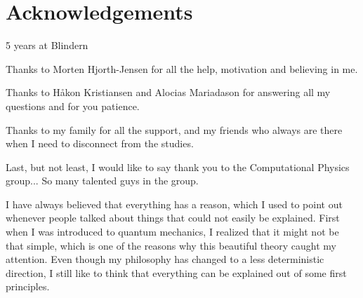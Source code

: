 \thispagestyle{empty}
\cleardoublepage

\section*{Acknowledgements}
5 years at Blindern

Thanks to Morten Hjorth-Jensen for all the help, motivation and believing in me.

Thanks to Håkon Kristiansen and Alocias Mariadason for answering all my questions and for you patience. 

Thanks to my family for all the support, and my friends who always are there when I need to disconnect from the studies. 

Last, but not least, I would like to say thank you to the Computational Physics group... So many talented guys in the group. 

I have always believed that everything has a reason, which I used to point out whenever people talked about things that could not easily be explained. First when I was introduced to quantum mechanics, I realized that it might not be that simple, which is one of the reasons why this beautiful theory caught my attention. Even though my philosophy has changed to a less deterministic direction, I still like to think that everything can be explained out of some first principles. 
    
\thispagestyle{empty}
\cleardoublepage

{%
    \tableofcontents
    \thispagestyle{empty}
    \clearpage}%

\thispagestyle{empty}
\clearpage


